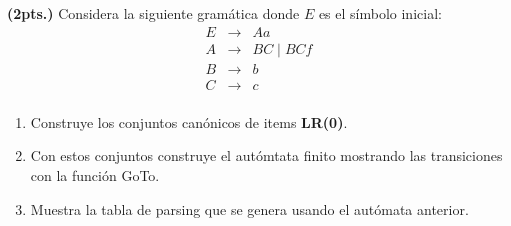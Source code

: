 
\textbf{(2pts.)} Considera la siguiente gram\'atica donde $E$ es el s\'imbolo
inicial:
\[
\begin{array}{rcl}
  E & \to & Aa\\
  A & \to & BC \mid BCf\\
  B & \to & b\\
  C & \to & c\\
\end{array}
\]
\begin{enumerate}
\item Construye los conjuntos can\'onicos de items \textbf{LR(0)}.
\item Con estos conjuntos construye el aut\'omtata finito mostrando las transiciones
  con la funci\'on GoTo.
\item Muestra la tabla de parsing que se genera usando el aut\'omata anterior. 
\end{enumerate}
